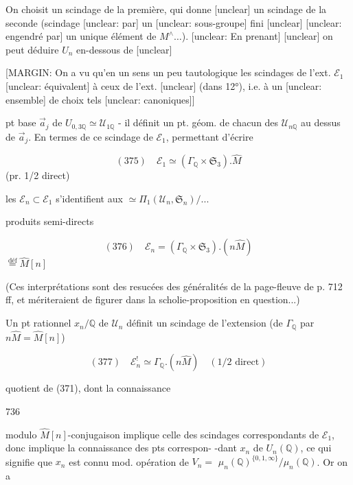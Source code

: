 On choisit un scindage de la première,
qui donne [unclear] un scindage de la seconde
(scindage [unclear: par] un [unclear: sous-groupe] fini [unclear]
[unclear: engendré par] un unique élément de $M^\wedge \dots$). [unclear: En prenant]
[unclear] on peut déduire $U_n$ en-dessous de [unclear]

[MARGIN: On a vu qu'en un sens un peu tautologique les scindages de l'ext. $\mathcal{E}_1$ [unclear: équivalent] à ceux de l'ext. [unclear] (dans 12°), i.e. à un [unclear: ensemble] de choix tels [unclear: canoniques]]

\newpage


pt base $\vec{a}_j$ de $U_{0,3 \mathbb{Q}} \simeq \mathcal{U}_{1 \mathbb{Q}}$ - il définit
un pt. géom. de chacun des $\mathcal{U}_{n \mathbb{Q}}$ au
dessus de $\vec{a}_j$. En termes de ce scindage
de $\mathcal{E}_1$, permettant d'écrire

$$ (375) \quad \mathcal{E}_1 \simeq (\Gamma_{\mathbb{Q}} \times \mathfrak{S}_3) . \hat{M} $$
(pr. 1/2 direct)

les $\mathcal{E}_n \subset \mathcal{E}_1$ s'identifient aux
$\simeq \Pi_1(\mathcal{U}_n, \mathfrak{S}_n)/...$

produits semi-directs

$$ (376) \quad \mathcal{E}_n = (\Gamma_{\mathbb{Q}} \times \mathfrak{S}_3) . (n\hat{M}) $$
$\overset{\text{déf}}{=} \hat{M}[n]$

(Ces interprétations sont des resucées des
généralités de la page-fleuve de p. 712
ff, et mériteraient de figurer dans
la scholie-proposition en question...)

Un pt rationnel $x_n / \mathbb{Q}$ de $\mathcal{U}_n$ définit
un scindage de l'extension (de $\Gamma_{\mathbb{Q}}$ par $n\hat{M} = \hat{M}[n]$)

$$ (377) \quad \mathcal{E}_n^! \simeq \Gamma_{\mathbb{Q}} . (n\hat{M}) \quad (\text{1/2 direct}) $$

quotient de (371), dont la connaissance

\newpage


736

modulo $\hat{M}[n]$-conjugaison implique celle
des scindages correspondants de $\mathcal{E}_1$, donc
implique la connaissance des pts correspon-
-dant $x_n$ de $U_n(\mathbb{Q})$, ce qui signifie
que $x_n$ est connu mod. opération de $V_n =$
$\mu_n(\mathbb{Q})^{\{0,1,\infty\}} / \mu_n(\mathbb{Q})$. Or on a

